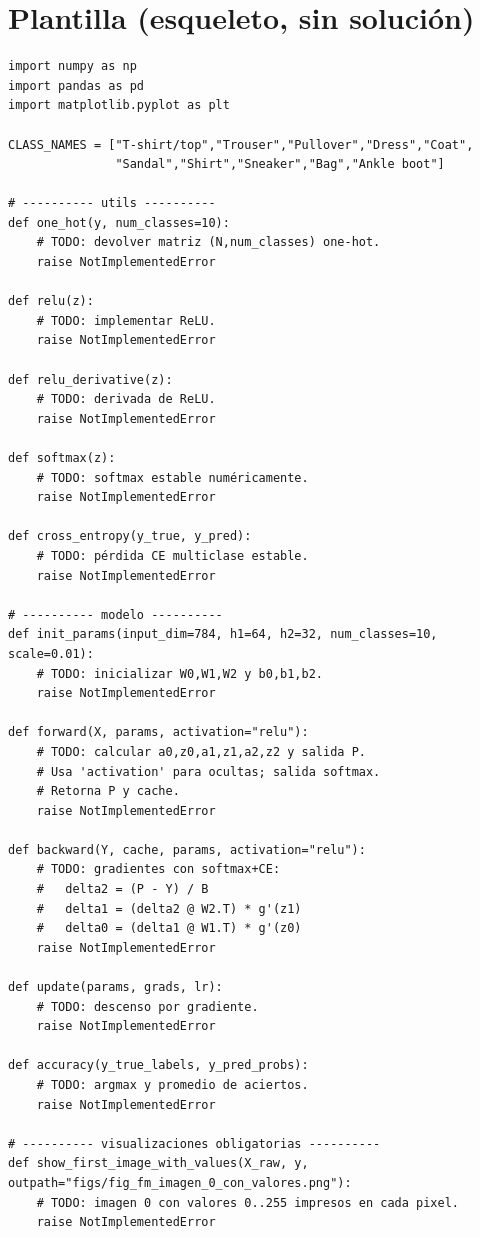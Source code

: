 \documentclass[12pt,a4paper]{article}
\begin{document}
\section*{Plantilla (esqueleto, sin solución)}
\begin{lstlisting}[style=mypy,caption={Esqueleto de src/reto_fashion.py con TODOs}]
import numpy as np
import pandas as pd
import matplotlib.pyplot as plt

CLASS_NAMES = ["T-shirt/top","Trouser","Pullover","Dress","Coat",
               "Sandal","Shirt","Sneaker","Bag","Ankle boot"]

# ---------- utils ----------
def one_hot(y, num_classes=10):
    # TODO: devolver matriz (N,num_classes) one-hot.
    raise NotImplementedError

def relu(z):
    # TODO: implementar ReLU.
    raise NotImplementedError

def relu_derivative(z):
    # TODO: derivada de ReLU.
    raise NotImplementedError

def softmax(z):
    # TODO: softmax estable numéricamente.
    raise NotImplementedError

def cross_entropy(y_true, y_pred):
    # TODO: pérdida CE multiclase estable.
    raise NotImplementedError

# ---------- modelo ----------
def init_params(input_dim=784, h1=64, h2=32, num_classes=10, scale=0.01):
    # TODO: inicializar W0,W1,W2 y b0,b1,b2.
    raise NotImplementedError

def forward(X, params, activation="relu"):
    # TODO: calcular a0,z0,a1,z1,a2,z2 y salida P.
    # Usa 'activation' para ocultas; salida softmax.
    # Retorna P y cache.
    raise NotImplementedError

def backward(Y, cache, params, activation="relu"):
    # TODO: gradientes con softmax+CE:
    #   delta2 = (P - Y) / B
    #   delta1 = (delta2 @ W2.T) * g'(z1)
    #   delta0 = (delta1 @ W1.T) * g'(z0)
    raise NotImplementedError

def update(params, grads, lr):
    # TODO: descenso por gradiente.
    raise NotImplementedError

def accuracy(y_true_labels, y_pred_probs):
    # TODO: argmax y promedio de aciertos.
    raise NotImplementedError

# ---------- visualizaciones obligatorias ----------
def show_first_image_with_values(X_raw, y, outpath="figs/fig_fm_imagen_0_con_valores.png"):
    # TODO: imagen 0 con valores 0..255 impresos en cada pixel.
    raise NotImplementedError


\end{lstlisting}
\end{document}
